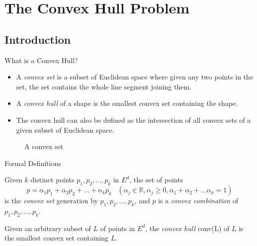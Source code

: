 \documentclass{beamer}
\begin{document}
\section{The Convex Hull Problem}
\subsection{Introduction}

\begin{frame}{What is a Convex Hull?}
    \begin{itemize}
        \item A \emph{convex set} is a subset of Euclidean space where given any two points in the set,  the set contains the whole line segment joining them.
        \item A  \emph{convex hull} of a shape is the smallest convex set containing the shape. 
        \item The convex hull can also be defined as the intersection of all convex
        sets of a given subset of Euclidean space. 
    \end{itemize}
    \begin{figure}
        \centering
        \caption{A convex set}
        \label{convex}
    \end{figure}
\end{frame}

\begin{frame}[t]{Formal Definitions}
    \begin{definition}
        Given $k$ distinct points $p_1, p_2, \dots, p_k$ in $E^d$, the set of points
        \[p = \alpha_1 p_1 + \alpha_2 p_2 + \dots + \alpha_k p_k
        \; \; \; (\alpha_j \in \mathbb{R}, \alpha_j \geq 0, \alpha_1 + \alpha_2 + \dots \alpha_k = 1)\]
        is the \textit{convex set} generation by $p_1, p_2, \dots, p_k$, and $p$ is a \textit{convex combination} of $p_1, p_2, \dots, p_k$.   
    \end{definition}
    \begin{definition}
        Given an arbitrary subset of $L$ of points in $E^d$, the \emph{convex hull} conv(L) of $L$ is the smallest convex set containing $L$. 
    \end{definition}
\end{frame}
\end{document}
